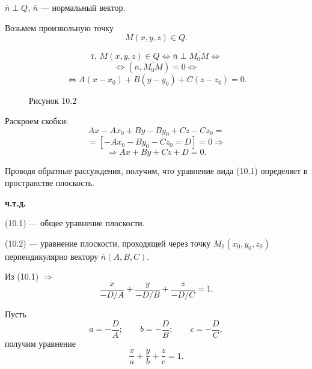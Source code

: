 \documentclass[12pt,a4paper]{article}
\newcommand{\vn}{\bar n}
\begin{document}
$\vn\perp Q$, $\vn$ --- нормальный вектор.

Возьмем произвольную точку
$$
M(x,y,z)\in Q.
$$

\begin{figure}[H]
  \centering
  \begin{minipage}{0.4\textwidth}
    \centering
    \caption*{Рисунок 10.2}
  \end{minipage}%
  \begin{minipage}{0.55\textwidth}
    $$
    \text{т. }M(x,y,z)\in Q
    \Leftrightarrow \vn\perp \overline{M_0M}
    \Leftrightarrow
    $$
    $$
    \Leftrightarrow (\vn,\overline{M_0M})=0
    \Leftrightarrow
    $$
    \begin{equation}
      \Leftrightarrow A(x-x_0)+B(y-y_0)+C(z-z_0)=0. \tag{10.2}
    \end{equation}
  \end{minipage}
\end{figure}

Раскроем скобки:
$$
Ax-Ax_0+By-By_0+Cz-Cz_0=
$$
$$
=[-Ax_0-By_0-Cz_0=D]=0\Rightarrow
$$
$$
\Rightarrow Ax+By+Cz+D=0.
$$

Проводя обратные рассуждения, получим, что уравнение вида (10.1)
определяет в пространстве плоскость.

\textbf{ч.т.д.}

(10.1) --- общее уравнение плоскости.

(10.2) --- уравнение плоскости, проходящей через точку $M_0(x_0,y_0,z_0)$
перпендикулярно вектору $\vn(A,B,C)$.

Из (10.1) $\Rightarrow$
$$
\frac{x}{-D/A}+\frac{y}{-D/B}+\frac{z}{-D/C}=1.
$$

Пусть
$$
a=-\frac DA;\qquad b=-\frac DB;\qquad c=-\frac DC,
$$
получим уравнение
\begin{equation}
  \frac xa+\frac yb+\frac zc=1. \tag{10.3}
\end{equation}
\end{document}
